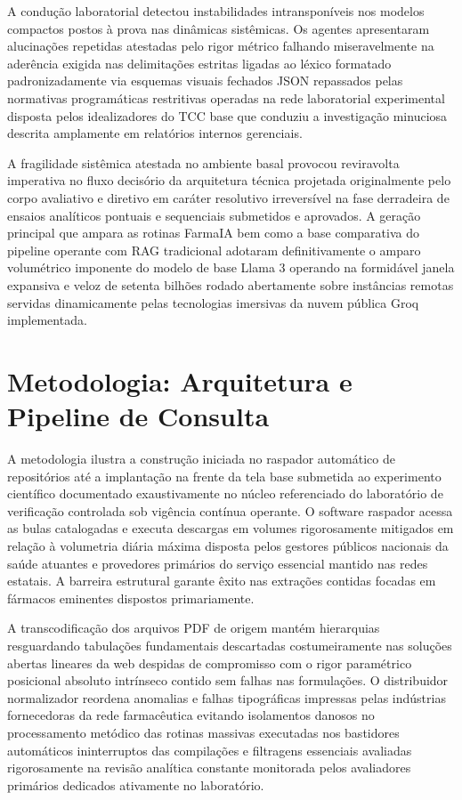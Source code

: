 \documentclass[12pt]{article}
\begin{document}
A condução laboratorial detectou instabilidades intransponíveis nos modelos compactos postos à prova nas dinâmicas sistêmicas. Os agentes apresentaram alucinações repetidas atestadas pelo rigor métrico falhando miseravelmente na aderência exigida nas delimitações estritas ligadas ao léxico formatado padronizadamente via esquemas visuais fechados JSON repassados pelas normativas programáticas restritivas operadas na rede laboratorial experimental disposta pelos idealizadores do TCC base que conduziu a investigação minuciosa descrita amplamente em relatórios internos gerenciais.

A fragilidade sistêmica atestada no ambiente basal provocou reviravolta imperativa no fluxo decisório da arquitetura técnica projetada originalmente pelo corpo avaliativo e diretivo em caráter resolutivo irreversível na fase derradeira de ensaios analíticos pontuais e sequenciais submetidos e aprovados. A geração principal que ampara as rotinas FarmaIA bem como a base comparativa do pipeline operante com RAG tradicional adotaram definitivamente o amparo volumétrico imponente do modelo de base Llama 3 operando na formidável janela expansiva e veloz de setenta bilhões rodado abertamente sobre instâncias remotas servidas dinamicamente pelas tecnologias imersivas da nuvem pública Groq implementada.

\section{Metodologia: Arquitetura e Pipeline de Consulta}
\label{sec:metodologia}

A metodologia ilustra a construção iniciada no raspador automático de repositórios até a implantação na frente da tela base submetida ao experimento científico documentado exaustivamente no núcleo referenciado do laboratório de verificação controlada sob vigência contínua operante. O software raspador acessa as bulas catalogadas e executa descargas em volumes rigorosamente mitigados em relação à volumetria diária máxima disposta pelos gestores públicos nacionais da saúde atuantes e provedores primários do serviço essencial mantido nas redes estatais. A barreira estrutural garante êxito nas extrações contidas focadas em fármacos eminentes dispostos primariamente.

A transcodificação dos arquivos PDF de origem mantém hierarquias resguardando tabulações fundamentais descartadas costumeiramente nas soluções abertas lineares da web despidas de compromisso com o rigor paramétrico posicional absoluto intrínseco contido sem falhas nas formulações. O distribuidor normalizador reordena anomalias e falhas tipográficas impressas pelas indústrias fornecedoras da rede farmacêutica evitando isolamentos danosos no processamento metódico das rotinas massivas executadas nos bastidores automáticos ininterruptos das compilações e filtragens essenciais avaliadas rigorosamente na revisão analítica constante monitorada pelos avaliadores primários dedicados ativamente no laboratório.
\end{document}
